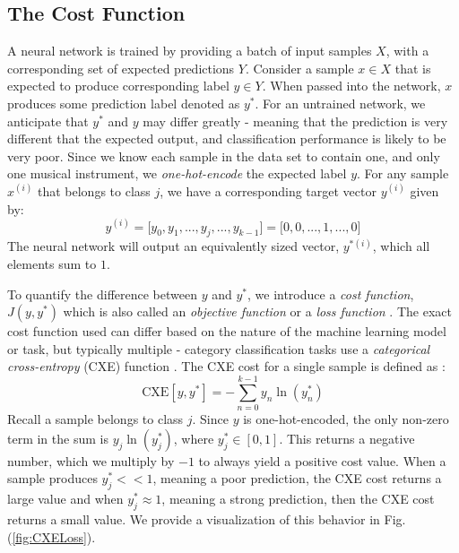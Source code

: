 \documentclass[conference,onecolumn,letterpaper]{IEEEtran}
\begin{document}

\subsection{The Cost Function}
\label{subsec:CostFunction}

A neural network is trained by providing a batch of input samples $X$, with a corresponding set of expected predictions $Y$. Consider a sample $x \in X$ that is expected to produce corresponding label $y \in Y$. When passed into the network, $x$ produces some prediction label denoted as $y^*$. For an untrained network, we anticipate that $y^*$ and $y$ may differ greatly - meaning that the prediction is very different that the expected output, and classification performance is likely to be very poor. Since we know each sample in the data set to contain one, and only one musical instrument, we \textit{one-hot-encode} the expected label $y$. For any sample $x^{(i)}$ that belongs to class $j$, we have a corresponding target vector $y^{(i)}$ given by:
\begin{equation}
    \label{eqn:OneHotEnc}
    y^{(i)} = \big[ y_{0} , y_{1}, ... , y_{j}, ... , y_{k-1} \big] = \big[ 0, 0, ... , 1, ... , 0 \big]
\end{equation}
The neural network will output an equivalently sized vector, $y^{*(i)}$, which all elements sum to $1$.

To quantify the difference between $y$ and $y^*$, we introduce a \textit{cost function}, $J(y,y^*)$ which is also called an \textit{objective function} or a \textit{loss function} \cite{James}. The exact cost function used can differ based on the nature of the machine learning model or task, but typically multiple - category classification tasks use a \textit{categorical cross-entropy} (CXE) function \cite{Geron,Goodfellow}. The CXE cost for a single sample is defined as \cite{Goodfellow,Virtanen}:
\begin{equation}
    \label{eqn:CXELoss}
    \text{CXE}[y,y^*] = - \sum_{n=0}^{k-1} y_{n} \ln(y^*_{n})
\end{equation}
Recall a sample belongs to class $j$. Since $y$ is one-hot-encoded, the only non-zero term in the sum is $y_{j} \ln(y^*_{j})$, where $y^*_{j} \in [0,1]$.  This returns a negative number, which we multiply by $-1$ to always yield a positive cost value. When a sample produces $y^*_{j} << 1$, meaning a poor prediction, the CXE cost returns a large value and when $y^*_{j} \approx 1$, meaning a strong prediction, then the CXE cost returns a small value. We provide a visualization of this behavior in Fig. (\ref{fig:CXELoss}).
\end{document}
